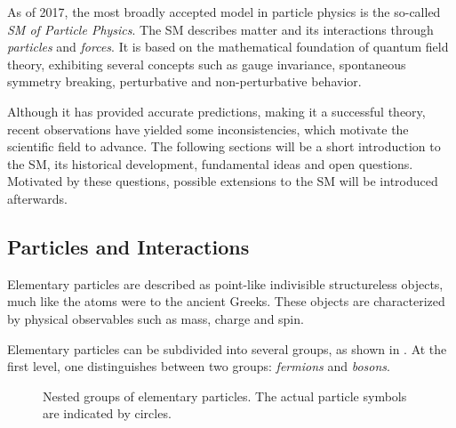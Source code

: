 As of 2017, the most broadly accepted model in particle physics is the so-called \emph{\acl{SM} of Particle Physics}. The \acl{SM} describes matter and its interactions through \emph{particles} and \emph{forces}. It is based on the mathematical foundation of quantum field theory, exhibiting several concepts such as gauge invariance, spontaneous symmetry breaking, perturbative and non-perturbative behavior.
 
Although it has provided accurate predictions, making it a successful theory, recent observations have yielded some inconsistencies, which motivate the scientific field to advance. The following sections will be a short introduction to the \acl{SM}, its historical development, fundamental ideas and open questions. Motivated by these questions, possible extensions to the \acl{SM} will be introduced afterwards.

\subsection{Particles and Interactions}
Elementary particles are described as point-like indivisible structureless objects, much like the atoms were to the ancient Greeks. These objects are characterized by physical observables such as mass, charge and spin.

Elementary particles can be subdivided into several groups, as shown in . 
At the first level, one distinguishes between two groups: \emph{fermions} and \emph{bosons}.

\begin{figure}
    \centering
    \caption{Nested groups of elementary particles. The actual particle symbols are indicated by circles.}
    \label{fig:particle_groups}
\end{figure}


